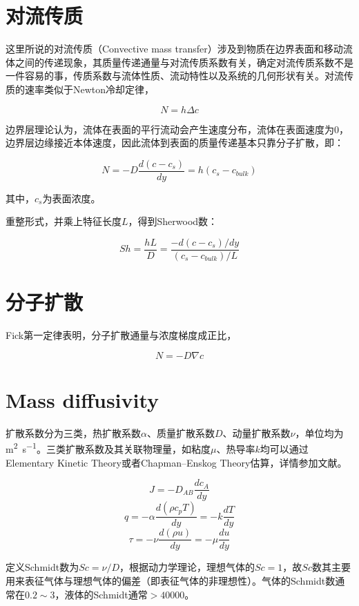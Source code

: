 \section{对流传质}

这里所说的对流传质（Convective mass transfer）涉及到物质在边界表面和移动流体之间的传递现象，其质量传递通量与对流传质系数有关，确定对流传质系数不是一件容易的事，传质系数与流体性质、流动特性以及系统的几何形状有关。对流传质的速率类似于Newton冷却定律，

\begin{equation}
N=h\Delta c
\end{equation}

边界层理论认为，流体在表面的平行流动会产生速度分布，流体在表面速度为0，边界层边缘接近本体速度，因此流体到表面的质量传递基本只靠分子扩散，即：

\[N=-D\frac{d(c-c_{s})}{dy} = h(c_s-c_{bulk})\]

其中，$ c_s $为表面浓度。

重整形式，并乘上特征长度$ L $，得到Sherwood数：

\[Sh = \frac{hL}{D} = \frac{-d(c-c_s)/dy}{(c_s-c_{bulk})/L}\]

\section{分子扩散}

Fick第一定律表明，分子扩散通量与浓度梯度成正比，

\begin{equation}\label{Fick's_1}
N = -D\nabla c
\end{equation}

\section{Mass diffusivity}
扩散系数分为三类，热扩散系数$ \alpha $、质量扩散系数$ D $、动量扩散系数$ \nu $，单位均为\si{\square\meter\per\second}。三类扩散系数及其关联物理量，如粘度$ \mu $、热导率$ k $均可以通过Elementary Kinetic Theory或者Chapman–Enskog Theory估算，详情参加文献\cite{yan2010CVD}。

\[J=-D_{AB}\frac{dc_A}{dy}\]
\[q=-\alpha\frac{d(\rho c_p T)}{dy} = -k\frac{dT}{dy} \]
\[\tau = -\nu\frac{d(\rho u)}{dy} = -\mu\frac{du}{dy}\]

定义Schmidt数为$ Sc=\nu/D $，根据动力学理论，理想气体的$ Sc=1 $，故$ Sc $数其主要用来表征气体与理想气体的偏差（即表征气体的非理想性）。气体的Schmidt数通常在$ 0.2\sim 3 $，液体的Schmidt通常$ >40000 $。

